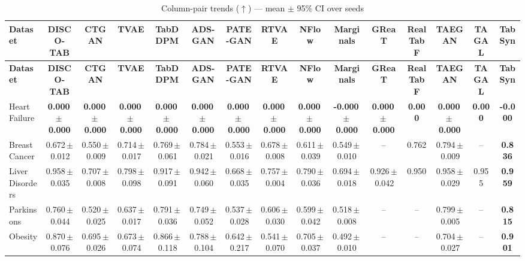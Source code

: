 \documentclass[8pt]{extarticle}
\begin{document}
\begin{longtable}{l*{14}{c}}
\caption{Column-pair trends ($\uparrow$) --- mean $\pm$ 95\% CI over seeds}\\
\toprule
\textbf{Dataset} & \textbf{DISCO-TAB} & \textbf{CTGAN} & \textbf{TVAE} & \textbf{TabDDPM} & \textbf{ADS-GAN} & \textbf{PATE-GAN} & \textbf{RTVAE} & \textbf{NFlow} & \textbf{Marginals} & \textbf{GReaT} & \textbf{RealTabF} & \textbf{TAEGAN} & \textbf{TAGAL} & \textbf{TabSyn} \\
\midrule
\endfirsthead
\toprule
\textbf{Dataset} & \textbf{DISCO-TAB} & \textbf{CTGAN} & \textbf{TVAE} & \textbf{TabDDPM} & \textbf{ADS-GAN} & \textbf{PATE-GAN} & \textbf{RTVAE} & \textbf{NFlow} & \textbf{Marginals} & \textbf{GReaT} & \textbf{RealTabF} & \textbf{TAEGAN} & \textbf{TAGAL} & \textbf{TabSyn} \\
\midrule
\endhead
\bottomrule
\endfoot
Heart Failure & \textbf{0.000\,$\pm$\,0.000} & \textbf{0.000\,$\pm$\,0.000} & \textbf{0.000\,$\pm$\,0.000} & \textbf{0.000\,$\pm$\,0.000} & \textbf{0.000\,$\pm$\,0.000} & \textbf{0.000\,$\pm$\,0.000} & \textbf{0.000\,$\pm$\,0.000} & \textbf{0.000\,$\pm$\,0.000} & \textbf{-0.000\,$\pm$\,0.000} & \textbf{0.000\,$\pm$\,0.000} & \textbf{0.000} & \textbf{0.000\,$\pm$\,0.000} & \textbf{0.000} & \textbf{-0.000} \\
Breast Cancer & 0.672\,$\pm$\,0.012 & 0.550\,$\pm$\,0.009 & 0.714\,$\pm$\,0.017 & 0.769\,$\pm$\,0.061 & 0.784\,$\pm$\,0.021 & 0.553\,$\pm$\,0.016 & 0.678\,$\pm$\,0.008 & 0.611\,$\pm$\,0.039 & 0.549\,$\pm$\,0.010 & -- & 0.762 & 0.794\,$\pm$\,0.009 & -- & \textbf{0.836} \\
Liver Disorders & 0.958\,$\pm$\,0.035 & 0.707\,$\pm$\,0.008 & 0.798\,$\pm$\,0.098 & 0.917\,$\pm$\,0.091 & 0.942\,$\pm$\,0.060 & 0.668\,$\pm$\,0.035 & 0.757\,$\pm$\,0.004 & 0.790\,$\pm$\,0.036 & 0.694\,$\pm$\,0.018 & 0.926\,$\pm$\,0.042 & 0.950 & 0.958\,$\pm$\,0.029 & 0.955 & \textbf{0.959} \\
Parkinsons & 0.760\,$\pm$\,0.044 & 0.520\,$\pm$\,0.025 & 0.637\,$\pm$\,0.017 & 0.791\,$\pm$\,0.036 & 0.749\,$\pm$\,0.052 & 0.537\,$\pm$\,0.028 & 0.606\,$\pm$\,0.030 & 0.599\,$\pm$\,0.042 & 0.518\,$\pm$\,0.008 & -- & -- & 0.799\,$\pm$\,0.005 & -- & \textbf{0.815} \\
Obesity & 0.870\,$\pm$\,0.076 & 0.695\,$\pm$\,0.026 & 0.673\,$\pm$\,0.074 & 0.866\,$\pm$\,0.118 & 0.788\,$\pm$\,0.104 & 0.642\,$\pm$\,0.217 & 0.541\,$\pm$\,0.070 & 0.705\,$\pm$\,0.037 & 0.492\,$\pm$\,0.010 & -- & -- & 0.704\,$\pm$\,0.027 & -- & \textbf{0.901} \\

\end{longtable}
\end{document}
